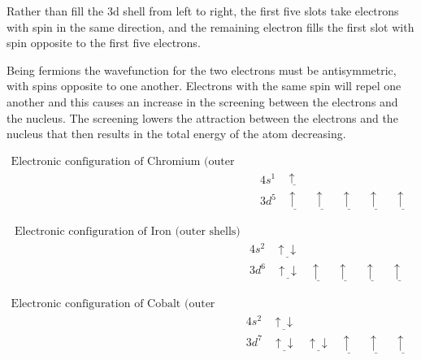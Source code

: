 Rather than fill the 3d shell from left to right, the first five slots take electrons with spin in the same direction, and the remaining electron fills the first slot with spin opposite to the first five electrons.

Being fermions the wavefunction for the two electrons must be antisymmetric, with spins opposite to one another.  Electrons with the same spin will repel one another and this causes an increase in the screening between the electrons and the nucleus.  The screening lowers the attraction between the electrons and the nucleus that then results in the total energy of the atom decreasing\cite{aligningelectrons}.

\begin{equation}
\begin{split}
\text{Electronic configuration of Chromium (outer shells)}\\
&4s^1 \:\:\:\:  \underline{\uparrow \:\:} \\
&3d^5 \:\:\:\:  \underline{\uparrow \:\:} \:\:\:\:  \underline{\uparrow \:\:} \:\:\:\:  \underline{\uparrow \:\:} \:\:\:\: \underline{\uparrow \:\:} \:\:\:\: \underline{\uparrow \:\:}
\end{split}
\label{eq:chromiumconfig}
\end{equation}

\begin{equation}
\begin{split}
\text{Electronic configuration of Iron (outer shells)}\\
&4s^2 \:\:\:\:  \underline{\uparrow \downarrow} \\
&3d^6 \:\:\:\:  \underline{\uparrow \downarrow} \:\:\:\:  \underline{\uparrow \:\:} \:\:\:\:  \underline{\uparrow \:\:} \:\:\:\: \underline{\uparrow \:\:} \:\:\:\: \underline{\uparrow \:\:}
\end{split}
\label{eq:ironconfig}
\end{equation}

\begin{equation}
\begin{split}
\text{Electronic configuration of Cobalt (outer shells)}\\
&4s^2 \:\:\:\:  \underline{\uparrow \downarrow} \\
&3d^7 \:\:\:\:  \underline{\uparrow \downarrow} \:\:\:\:  \underline{\uparrow  \downarrow} \:\:\:\:  \underline{\uparrow \:\:} \:\:\:\: \underline{\uparrow \:\:} \:\:\:\: \underline{\uparrow \:\:}
\end{split}
\label{eq:cobaltconfig}
\end{equation}

